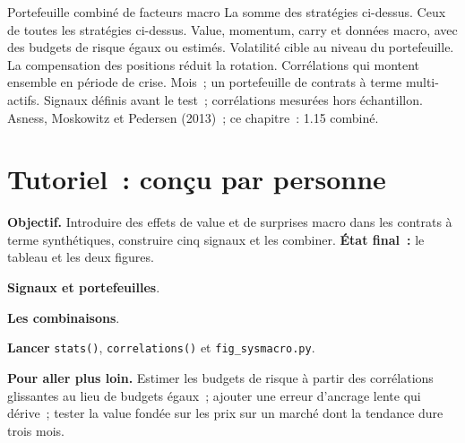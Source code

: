 \begin{strategyfile}{Portefeuille combiné de facteurs macro}\label{strat:s2:systematic-macro:combined}
 La somme des stratégies ci-dessus.
 Ceux de toutes les stratégies ci-dessus.
 Value, momentum, carry et données macro, avec des budgets de risque égaux ou estimés.
 Volatilité cible au niveau du portefeuille.
 La compensation des positions réduit la rotation.
 Corrélations qui montent ensemble en période de crise.
 Mois~; un portefeuille de contrats à terme multi-actifs.
 Signaux définis avant le test~; corrélations mesurées hors échantillon.
 Asness, Moskowitz et Pedersen (2013)~; ce chapitre~: 1.15 combiné.
\end{strategyfile}

\section{Tutoriel~: conçu par personne}\label{tut:s2:systematic-macro:tut}

\begin{tutorial}
\textbf{Objectif.} Introduire des effets de value et de surprises macro dans les contrats à terme synthétiques, construire cinq signaux et les combiner. \textbf{État final~:} le tableau
et les deux figures.
\begin{tutsteps}
\item \textbf{Signaux et portefeuilles}.
\label{lst:s2:systematic-macro:signals}
\item \textbf{Les combinaisons}.
\label{lst:s2:systematic-macro:books}
\item \textbf{Lancer} \texttt{stats()}, \texttt{correlations()} et \texttt{fig\_sysmacro.py}.
\end{tutsteps}
\textbf{Pour aller plus loin.} Estimer les budgets de risque à partir des corrélations glissantes au lieu de budgets égaux~; ajouter une erreur d'ancrage lente qui dérive~;
tester la value fondée sur les prix sur un marché dont la tendance dure trois mois.
\end{tutorial}

